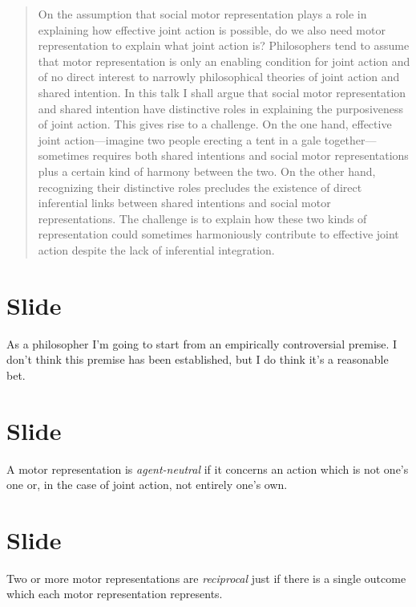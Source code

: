 \documentclass[12pt,\papersize]{extarticle}
\begin{document}
\setlength\footnotesep{1em}


\maketitle
\title{}

\begin{abstract}
On the assumption that social motor representation plays a role in explaining how effective joint action is possible, do we also need motor representation to explain what joint action is?  Philosophers tend to assume that motor representation is only an enabling condition for joint action and of no direct interest to narrowly philosophical theories of joint action and shared intention.  In this talk I shall argue that social motor representation and shared intention  have distinctive roles in explaining the purposiveness of joint action.  This gives rise to a challenge.  On the one hand, effective joint action---imagine two people erecting a tent in a gale together---sometimes requires both shared intentions and social motor representations plus a certain kind of harmony between the two.  On the other hand, recognizing their distinctive roles precludes the existence of direct inferential links between shared intentions and social motor representations.  The challenge is to explain how these two kinds of representation could sometimes harmoniously contribute to effective joint action despite the lack of inferential integration.
\end{abstract}

\section{Slide}
As a philosopher I’m going to start from an empirically controversial premise.
I don’t think this premise has been established, but I do think it’s a reasonable bet.


\section{Slide}
A motor representation is \emph{agent-neutral} if it concerns an action which is not one’s one or, in the case of joint action, not entirely one’s own.


\section{Slide}
Two or more motor representations are \emph{reciprocal} just if there is a single outcome which each motor representation represents.
\end{document}
